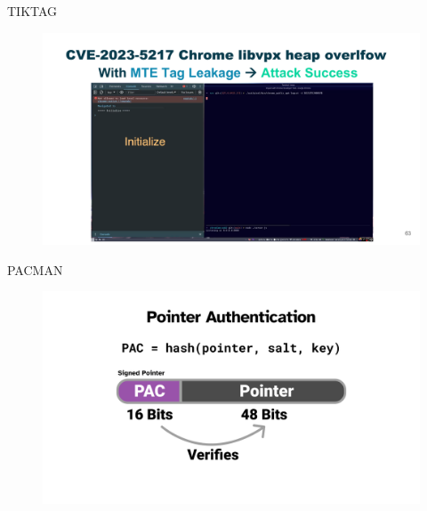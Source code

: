 \documentclass{beamer}
\begin{document}
\begin{frame}{TIKTAG\cite{tiktag}}
    \begin{figure}
        \begin{center}
            \includegraphics[width=1\textwidth]{img/cve.pdf}
        \end{center}
    \end{figure} 
\end{frame}

\begin{frame}{PACMAN\cite{pacman}}
    \begin{figure}
        \begin{center}
            \includegraphics[width=1\textwidth]{img/pac.pdf}
        \end{center}
    \end{figure} 
\end{frame}
\end{document}
